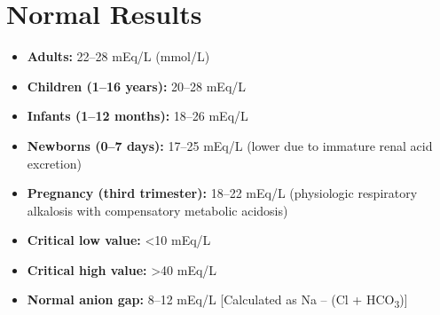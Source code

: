 \section*{Normal Results}
\begin{itemize}
  \item \textbf{Adults:} 22--28 mEq/L (mmol/L)
  \item \textbf{Children (1--16 years):} 20--28 mEq/L
  \item \textbf{Infants (1--12 months):} 18--26 mEq/L
  \item \textbf{Newborns (0--7 days):} 17--25 mEq/L (lower due to immature renal acid excretion)
  \item \textbf{Pregnancy (third trimester):} 18--22 mEq/L (physiologic respiratory alkalosis with compensatory metabolic acidosis)
  \item \textbf{Critical low value:} <10 mEq/L
  \item \textbf{Critical high value:} >40 mEq/L
  \item \textbf{Normal anion gap:} 8--12 mEq/L [Calculated as Na -- (Cl + HCO\textsubscript{3})]
\end{itemize}

